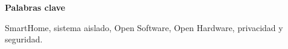 \vspace{1cm}


\begin{center}

{\bf \Large Palabras clave}

   \end{center}

   \vspace{0.5cm}

   SmartHome, sistema aislado, Open Software, Open Hardware, privacidad y seguridad.
